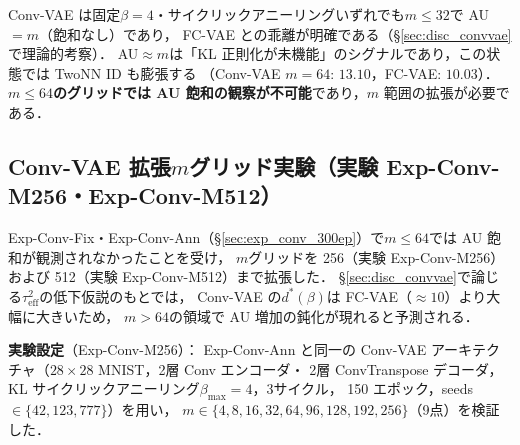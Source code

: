 \documentclass[11pt,a4paper]{jsarticle}
\begin{document}
Conv-VAE は固定$\beta=4$・サイクリックアニーリングいずれでも$m \leq 32$で AU$=m$（飽和なし）であり，
FC-VAE との乖離が明確である（§\ref{sec:disc_convvae}で理論的考察）．
AU$\approx m$は「KL 正則化が未機能」のシグナルであり，この状態では TwoNN ID も膨張する
（Conv-VAE $m=64$: $13.10$，FC-VAE: $10.03$）．
\textbf{$m \leq 64$のグリッドでは AU 飽和の観察が不可能}であり，$m$ 範囲の拡張が必要である．

\subsection{Conv-VAE 拡張$m$グリッド実験（実験 Exp-Conv-M256・Exp-Conv-M512）}\label{sec:exp_en}

Exp-Conv-Fix・Exp-Conv-Ann（§\ref{sec:exp_conv_300ep}）で$m \leq 64$では AU 飽和が観測されなかったことを受け，
$m$グリッドを 256（実験 Exp-Conv-M256）および 512（実験 Exp-Conv-M512）まで拡張した．
§\ref{sec:disc_convvae}で論じる$\tau^2_\mathrm{eff}$の低下仮説のもとでは，
Conv-VAE の$d^*(\beta)$は FC-VAE（$\approx 10$）より大幅に大きいため，
$m>64$の領域で AU 増加の鈍化が現れると予測される．

\textbf{実験設定}（Exp-Conv-M256）：
Exp-Conv-Ann と同一の Conv-VAE アーキテクチャ（$28\times28$ MNIST，2層 Conv エンコーダ・
2層 ConvTranspose デコーダ，KL サイクリックアニーリング$\beta_\mathrm{max}=4$，3サイクル，
150 エポック，seeds$\in\{42,123,777\}$）を用い，
$m \in \{4, 8, 16, 32, 64, 96, 128, 192, 256\}$（9点）を検証した．
\end{document}

